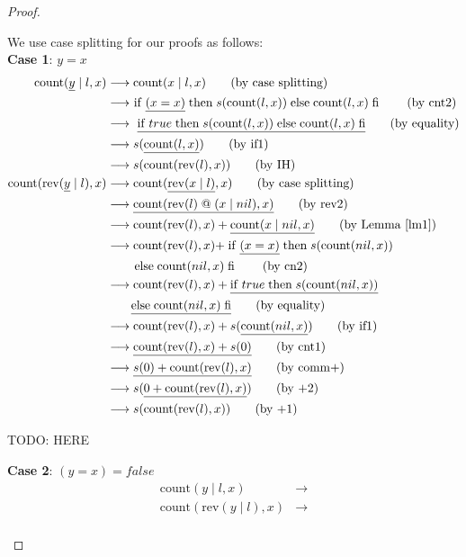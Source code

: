 \documentclass[12pt, a4paper]{article}
\newcommand{\rel}[1]{\mathrel{#1}}
\newcommand{\rmx}[1]{\mathrm{#1}}
\newcommand{\larrow}{\longrightarrow}
\newcommand{\under}{\underline}
\begin{document}
\begin{proof}
\begin{description}
We use case splitting for our proofs as follows: \\
\textbf{Case 1}: $y = x$
\begin{align*}
\rmx{count}(\under{y} \mid l, x)
	&\larrow \rmx{count}(x \mid l, x) \tag{by case splitting} \\
	&\larrow\ \rel{\rmx{if}} \under{(x = x)} \rel{\rmx{then}} s(\rmx{count}(l, x)) \rel{\rmx{else}} \rmx{count}(l, x) \rel{\rmx{fi}} \tag{by cnt2} \\
	&\larrow\ \under{\rel{\rmx{if}} true \rel{\rmx{then}} s(\rmx{count}(l, x)) \rel{\rmx{else}} \rmx{count}(l, x) \rel{\rmx{fi}}} \tag{by equality} \\
	&\larrow s(\under{\rmx{count}(l, x)}) \tag{by if1} \\
	&\larrow s(\rmx{count}(\rmx{rev}(l), x)) \tag{by IH} \\
\rmx{count}(\rmx{rev}(\under{y} \mid l), x)
	&\larrow \rmx{count}(\under{\rmx{rev}(x \mid l)}, x) \tag{by case splitting} \\
	&\larrow \under{\rmx{count}(\rmx{rev}(l) \rel{@} (x \mid nil), x)} \tag{by rev2} \\
	&\larrow \rmx{count}(\rmx{rev}(l), x) + \under{\rmx{count}(x \mid nil, x)} \tag{by Lemma~\ref{lm1}} \\
	&\larrow \rmx{count}(\rmx{rev}(l), x) + \rel{\rmx{if}} \under{(x = x)} \rel{\rmx{then}} s(\rmx{count}(nil,x)) \\
	&\quad \quad \rel{\rmx{else}} \rmx{count}(nil,x) \rel{\rmx{fi}} \tag{by cn2} \\
	&\larrow \rmx{count}(\rmx{rev}(l), x) + \under{\rel{\rmx{if}} true \rel{\rmx{then}} s(\rmx{count}(nil,x))} \\
	&\quad \quad \under{\rel{\rmx{else}} \rmx{count}(nil,x) \rel{\rmx{fi}}} \tag{by equality} \\
	&\larrow \rmx{count}(\rmx{rev}(l), x) + s(\under{\rmx{count}(nil,x)}) \tag{by if1} \\
	&\larrow \under{\rmx{count}(\rmx{rev}(l), x) + s(0)} \tag{by cnt1} \\
	&\larrow \under{s(0) + \rmx{count}(\rmx{rev}(l), x)} \tag{by comm+} \\
	&\larrow s(\under{0 + \rmx{count}(\rmx{rev}(l), x)}) \tag{by +2} \\
	&\larrow s(\rmx{count}(\rmx{rev}(l), x)) \tag{by +1}
\end{align*}

TODO: HERE

\textbf{Case 2}: $(y = x) = false$
\begin{align*}
\rmx{count}(y \mid l, x)
	&\larrow \tag{by sum2} \\
\rmx{count}(\rmx{rev}(y \mid l), x)
	&\larrow \tag{by rev2} \\
\end{align*}
\end{description}

\end{proof}
\end{document}
